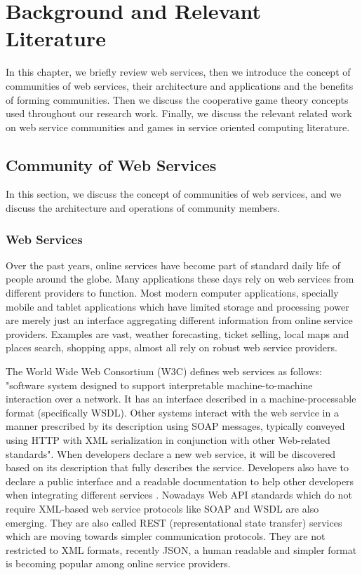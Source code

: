 \setcounter{chapter}{1}

\chapter{Background and Relevant Literature}\label{sec:MAS}

In this chapter, we briefly review web services, then we introduce the concept of communities of web services, their architecture and applications and the benefits of forming communities. Then we discuss the cooperative game theory concepts used throughout our research work. Finally, we discuss the relevant related work on web service communities and games in service oriented computing literature.

    \section{Community of Web Services}\label{sec:CommunityWS}
    In this section, we discuss the concept of communities of web services, and we discuss the architecture and operations of community members.

        \subsection{Web Services}\label{sec:CWSWebServices}
        Over the past years, online services have become part of standard daily life of people around the globe. Many applications these days rely on
        web services from different providers to function. Most modern computer applications, specially
        mobile and tablet applications which have limited storage and processing power
        are merely just an interface aggregating different information from online service providers.
        Examples are vast, weather forecasting, ticket selling, local maps and places search, shopping apps, almost all rely on
        robust web service providers.

        The World Wide Web Consortium (W3C) defines web services as follows: "software
        system designed to support interpretable machine-to-machine interaction over a network.
        It has an interface described in a machine-processable format (specifically WSDL). Other
        systems interact with the web service in a manner prescribed by its description using
        SOAP messages, typically conveyed using HTTP with XML serialization in conjunction
        with other Web-related standards". When developers declare a new web service, it will
        be discovered based on its description that fully describes the service. Developers also
        have to declare a public interface and a readable documentation to help other developers
        when integrating different services \cite{w3cwsdl}. Nowadays Web API standards which do not
        require XML-based web service protocols like SOAP and WSDL are also emerging. They are also called
        REST (representational state transfer) services which are moving towards simpler communication protocols.
        They are not restricted to XML formats, recently JSON, a human readable and simpler format is becoming popular among online service providers.

